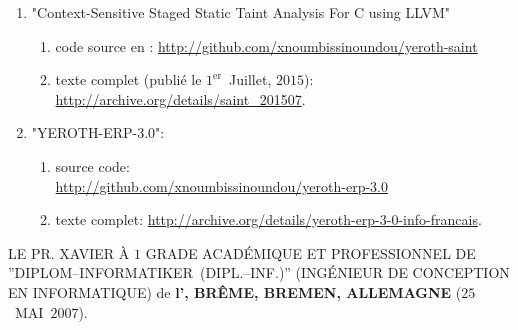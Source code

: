 \begin{enumerate}
	\item "Context-Sensitive Staged Static Taint Analysis
			For C using LLVM"
		\begin{enumerate}[1.]
			\itemsep -0.7em
			\item code source en \cplusplus: \url{http://github.com/xnoumbissinoundou/yeroth-saint}
			\item texte complet (publié le $1^\text{er}$~Juillet, $2015$): \url{http://archive.org/details/saint_201507}.
		\end{enumerate}		 

	\item "YEROTH-ERP-3.0":
			\begin{enumerate}[1.]
			\itemsep -0.7em
			\item source code: \\
			\url{http://github.com/xnoumbissinoundou/yeroth-erp-3.0}
			\item texte complet:
				\url{http://archive.org/details/yeroth-erp-3-0-info-francais}.
		\end{enumerate}	
\end{enumerate}


LE PR. XAVIER À $1$ GRADE ACADÉMIQUE ET PROFESSIONNEL
DE ''DIPLOM--INFORMATIKER~(DIPL.--INF.)''
(INGÉNIEUR DE CONCEPTION EN INFORMATIQUE) de
\textbf{l'\bremenu, BRÊME, BREMEN, ALLEMAGNE}
($25$~MAI~$2007$).

